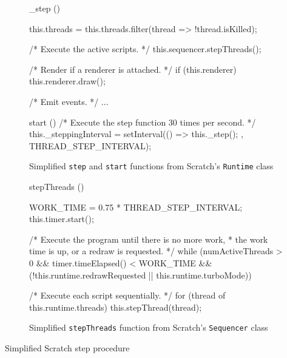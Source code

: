 \begin{listing}[htpb]
    \centering
    \begin{subfigure}{.9\textwidth}
        \begin{javascriptcode}
            _step () {
                this.threads = this.threads.filter(thread => !thread.isKilled);

                /* Execute the active scripts. */
                this.sequencer.stepThreads();

                /* Render if a renderer is attached. */
                if (this.renderer) {
                    this.renderer.draw();
                }

                /* Emit events. */
                ...
            }

            start () {
                /* Execute the step function 30 times per second. */
                this._steppingInterval = setInterval(() => {
                    this._step();
                }, THREAD_STEP_INTERVAL);
            }
        \end{javascriptcode}
        \vspace{-\bigskipamount}
        \caption{Simplified \texttt{step} and \texttt{start} functions from Scratch's \texttt{Runtime} class}
    \end{subfigure}

    \bigskip

    \begin{subfigure}{.9\textwidth}
        \begin{javascriptcode}
            stepThreads () {
                WORK_TIME = 0.75 * THREAD_STEP_INTERVAL;
                this.timer.start();

                /* Execute the program until there is no more work,
                 * the work time is up, or a redraw is requested. */
                while (numActiveThreads > 0 &&
                       timer.timeElapsed() < WORK_TIME &&
                       (!this.runtime.redrawRequested || this.runtime.turboMode)) {

                    /* Execute each script sequentially. */
                    for (thread of this.runtime.threads) {
                        this.stepThread(thread);
                    }
                }
            }
        \end{javascriptcode}
        \vspace{-\bigskipamount}
        \caption{Simplified \texttt{stepThreads} function from Scratch's \texttt{Sequencer} class}
    \end{subfigure}
    \caption{Simplified Scratch step procedure}
    \label{lst:simplified_scratch_step}
\end{listing}

